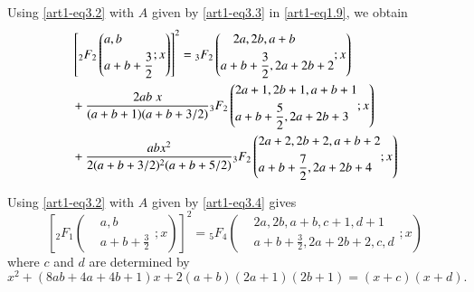 Using \eqref{art1-eq3.2} with $A$ given by \eqref{art1-eq3.3} in \eqref{art1-eq1.9}, we obtain
\begin{align}
& \left[{}_2 F_2 \left(
\begin{aligned}
& a, b\\
& a+ b + \frac{3}{2}
\end{aligned};x
 \right) \right]^2 = {}_3 F_2 
\left(
\begin{aligned}
& \quad 2a, 2b, a+b\\
& a+b+\frac{3}{2}, 2a + 2b + 2
\end{aligned} ;x
\right)\label{art1-eq3.6}\\
& + \frac{2ab \; x}{(a+b+1) (a+b+3/2)} {}_3 F_2 
\left(
\begin{aligned}
& 2a + 1, 2 b+1, a+b+1\\
& a+b+\frac{5}{2}, 2a + 2b+3
\end{aligned};x
 \right)\notag\\
& +  \frac{ab x^2}{2 (a+b+3/2)^2 (a+b+5/2)} {}_3 F_2 
\left(
\begin{aligned}
& 2a +2, 2b+2, a+ b+2\\
& a+b +\frac{7}{2}, 2a+ 2b+4 
\end{aligned};x
\right) \notag
\end{align}

Using \eqref{art1-eq3.2} with $A$ given by \eqref{art1-eq3.4} gives
\begin{equation}
\left[{}_2 F_1 
\left(
\begin{aligned}
& a, b\\
& a + b+ \frac{3}{2}
\end{aligned} ;x  
\right) \right]^2 = {}_5 F_4 
\left(
\begin{aligned}
& 2a, 2b, a + b, c+ 1, d+1\\
& a+b+\frac{3}{2}, 2a+ 2b + 2, c, d
\end{aligned};x
\right) \label{art1-eq3.7}
\end{equation}
where $c$ and $d$ are determined by 
\begin{equation}
x^2 + (8ab +4a+4b+1) x + 2  (a+b) (2a+1) (2b+1) = (x+c) (x+d). 
\label{art1-eq3.8}
\end{equation}


